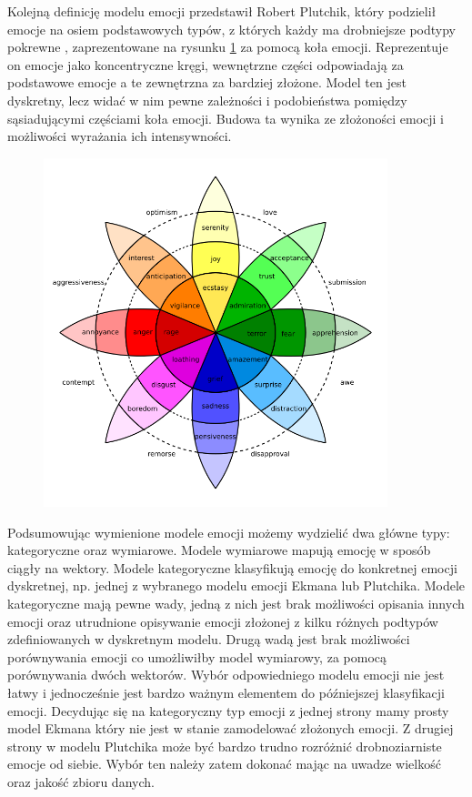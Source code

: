 Kolejną definicję modelu emocji przedstawił Robert Plutchik, który podzielił emocje na osiem podstawowych typów, z których każdy ma drobniejsze podtypy pokrewne \cite{plutchik1982psychoevolutionary}, zaprezentowane na rysunku \ref{rys:plutchik_wheel} za pomocą koła emocji. Reprezentuje on emocje jako koncentryczne kręgi, wewnętrzne części odpowiadają za podstawowe emocje a te zewnętrzna za bardziej złożone. Model ten jest dyskretny, lecz widać w nim pewne zależności i podobieństwa pomiędzy sąsiadującymi częściami koła emocji. Budowa ta wynika ze złożoności emocji i możliwości wyrażania ich intensywności.   

\begin{figure}[t]
\centering\includegraphics[width=10cm]{figures/plutchik-wheel.png}
\label{rys:plutchik_wheel}
\end{figure}

Podsumowując wymienione modele emocji możemy wydzielić dwa główne typy: kategoryczne oraz wymiarowe. Modele wymiarowe mapują emocję w sposób ciągły na wektory. Modele kategoryczne klasyfikują emocję do konkretnej emocji dyskretnej, np. jednej z wybranego modelu emocji Ekmana lub Plutchika. Modele kategoryczne mają pewne wady, jedną z nich jest brak możliwości opisania innych emocji oraz utrudnione opisywanie emocji złożonej z kilku różnych podtypów zdefiniowanych w dyskretnym modelu. Drugą wadą jest brak możliwości porównywania emocji co umożliwiłby model wymiarowy, za pomocą porównywania dwóch wektorów. Wybór odpowiedniego modelu emocji nie jest łatwy i jednocześnie jest bardzo ważnym elementem do późniejszej klasyfikacji emocji. Decydując się na kategoryczny typ emocji z jednej strony mamy prosty model Ekmana który nie jest w stanie zamodelować złożonych emocji. Z drugiej strony w modelu Plutchika może być bardzo trudno rozróżnić drobnoziarniste emocje od siebie. Wybór ten należy zatem dokonać mając na uwadze wielkość oraz jakość zbioru danych.